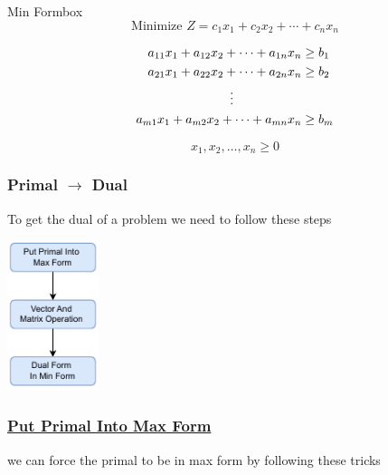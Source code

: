 \begin{prettyBox}{Min Form}{box}
 \[
    \text{Minimize } Z = c_1x_1 + c_2x_2 + \cdots + c_nx_n
\]

\vspace{0.25cm}
\hspace{1cm}
\[
\begin{aligned}
    a_{11}x_1 + a_{12}x_2 + \cdots + a_{1n}x_n &\geq b_1 \\
    a_{21}x_1 + a_{22}x_2 + \cdots + a_{2n}x_n &\geq b_2 \\
    &\hspace{-2cm}\vdots \\
    a_{m1}x_1 + a_{m2}x_2 + \cdots + a_{mn}x_n &\geq b_m
\end{aligned}
\]

\[
    x_1, x_2, \dots, x_n \geq 0  
\]
   
\end{prettyBox}

\newpage

\subsubsection{Primal \(\to\) Dual}
To get the dual of a problem we need to follow these steps

\vspace{0.35cm}

\begin{center}
    \includegraphics[width = 0.2\textwidth]{Chapters/Diagram/dual.drawio.pdf}
\end{center}

\subsubsection*{\underline{Put Primal Into Max Form}}
we can force the primal to be in max form by following these tricks 

